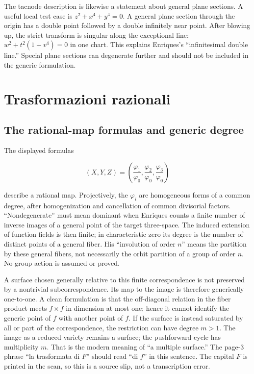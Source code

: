 The tacnode description is likewise a statement about general plane sections. A useful local test case is \(z^2+x^4+y^4=0\). A general plane section through the origin has a double point followed by a double infinitely near point. After blowing up, the strict transform is singular along the exceptional line: \(w^2+t^2(1+v^4)=0\) in one chart. This explains Enriques's ``infinitesimal double line.'' Special plane sections can degenerate further and should not be included in the generic formulation.

\section{Trasformazioni razionali}
\label{enriques-intro-2}

\subsection{The rational-map formulas and generic degree}

The displayed formulas

\[
(X,Y,Z)=\left(\frac{\varphi_1}{\varphi_0},
\frac{\varphi_2}{\varphi_0},\frac{\varphi_3}{\varphi_0}\right)
\]

describe a rational map. Projectively, the \(\varphi_i\) are homogeneous forms of a common degree, after homogenization and cancellation of common divisorial factors. ``Nondegenerate'' must mean dominant when Enriques counts a finite number of inverse images of a general point of the target three-space. The induced extension of function fields is then finite; in characteristic zero its degree is the number of distinct points of a general fiber. His ``involution of order \(n\)'' means the partition by these general fibers, not necessarily the orbit partition of a group of order \(n\). No group action is assumed or proved.

A surface chosen generally relative to this finite correspondence is not preserved by a nontrivial subcorrespondence. Its map to the image is therefore generically one-to-one. A clean formulation is that the off-diagonal relation in the fiber product meets \(f\times f\) in dimension at most one; hence it cannot identify the generic point of \(f\) with another point of \(f\). If the surface is instead saturated by all or part of the correspondence, the restriction can have degree \(m>1\). The image as a reduced variety remains a surface; the pushforward cycle has multiplicity \(m\). That is the modern meaning of ``a multiple surface.'' The page-3 phrase ``la trasformata di \(F\)'' should read ``di \(f\)'' in this sentence. The capital \(F\) is printed in the scan, so this is a source slip, not a transcription error.

